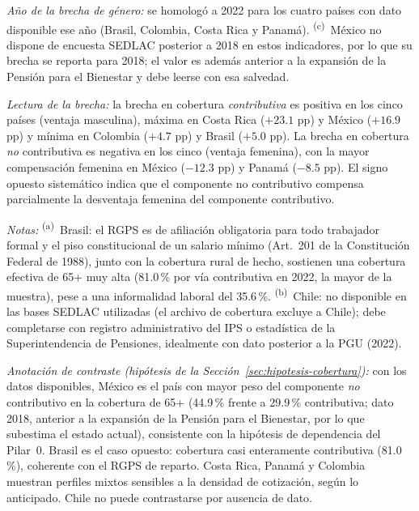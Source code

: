 \documentclass[12pt, letterpaper]{article}
\begin{document}
\begin{table}[h!]
\smallskip
\textit{Año de la brecha de género:} se homologó a 2022 para los cuatro países con dato disponible ese año (Brasil, Colombia, Costa Rica y Panamá). \textsuperscript{(c)}~México no dispone de encuesta SEDLAC posterior a 2018 en estos indicadores, por lo que su brecha se reporta para 2018; el valor es además anterior a la expansión de la Pensión para el Bienestar y debe leerse con esa salvedad.

\smallskip
\textit{Lectura de la brecha:} la brecha en cobertura \textit{contributiva} es positiva en los cinco países (ventaja masculina), máxima en Costa Rica ($+23.1$ pp) y México ($+16.9$ pp) y mínima en Colombia ($+4.7$ pp) y Brasil ($+5.0$ pp). La brecha en cobertura \textit{no} contributiva es negativa en los cinco (ventaja femenina), con la mayor compensación femenina en México ($-12.3$ pp) y Panamá ($-8.5$ pp). El signo opuesto sistemático indica que el componente no contributivo compensa parcialmente la desventaja femenina del componente contributivo.

\smallskip
\textit{Notas:} \textsuperscript{(a)}~Brasil: el RGPS es de afiliación obligatoria para todo trabajador formal y el piso constitucional de un salario mínimo (Art.\ 201 de la Constitución Federal de 1988), junto con la cobertura rural de hecho, sostienen una cobertura efectiva de 65+ muy alta (81.0\,\% por vía contributiva en 2022, la mayor de la muestra), pese a una informalidad laboral del 35.6\,\%. \textsuperscript{(b)}~Chile: no disponible en las bases SEDLAC utilizadas (el archivo de cobertura excluye a Chile); debe completarse con registro administrativo del IPS o estadística de la Superintendencia de Pensiones, idealmente con dato posterior a la PGU (2022).

\smallskip
\textit{Anotación de contraste (hipótesis de la Sección~\ref{sec:hipotesis-cobertura}):} con los datos disponibles, México es el país con mayor peso del componente \textit{no} contributivo en la cobertura de 65+ (44.9\,\% frente a 29.9\,\% contributiva; dato 2018, anterior a la expansión de la Pensión para el Bienestar, por lo que subestima el estado actual), consistente con la hipótesis de dependencia del Pilar~0. Brasil es el caso opuesto: cobertura casi enteramente contributiva (81.0\,\%), coherente con el RGPS de reparto. Costa Rica, Panamá y Colombia muestran perfiles mixtos sensibles a la densidad de cotización, según lo anticipado. Chile no puede contrastarse por ausencia de dato.
\end{table}

\newpage
\end{document}
